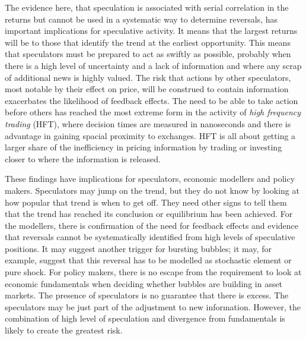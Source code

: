 \documentclass[12pt, a4paper, oneside]{article} %
\begin{document}
The evidence here, that speculation is associated with serial correlation in the returns but cannot be used in a systematic way to determine reversals, has important implications for speculative activity.  It means that the largest returns will be to those that identify the trend at the earliest opportunity.  This means that speculators must be prepared to act as swiftly as possible, probably when there is a high level of uncertainty and a lack of information and where any scrap of additional news is highly valued.   The risk that actions by other speculators, most notable by their effect on price, will be construed to contain information exacerbates the likelihood of feedback effects.  The need to be able to take action before others has reached the most extreme form in the activity of \emph{high frequency trading} (HFT), where decision times are measured in nanoseconds and there is advantage in gaining spacial proximity to exchanges.  HFT is all about getting  a larger share of the inefficiency in pricing information by trading or investing closer to where the information is released.  

These findings have implications for speculators, economic modellers and policy makers.  Speculators may jump on the trend, but they do not know by looking at how popular that trend is when to get off.  They need other signs to tell them that the trend has reached its conclusion or equilibrium has been achieved.  For the modellers, there is confirmation of the need  for feedback effects and evidence that reversals cannot be systematically identified from high levels of speculative positions.  It may suggest another trigger for bursting bubbles; it may, for example, suggest that this reversal has to be modelled as stochastic element or pure shock. For policy makers, there is no escape from the requirement to look at economic fundamentals when deciding whether bubbles are building in asset markets.  The presence of speculators is no guarantee that there is excess.  The speculators may be just part of the adjustment to new information.   However, the combination of high level of speculation and divergence from fundamentals is likely to create the greatest risk. 


\end{document}
